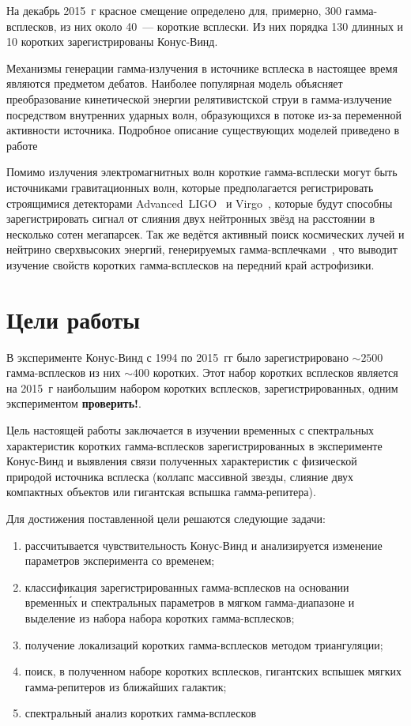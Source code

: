 На декабрь 2015~г красное смещение определено для, примерно, 300 гамма-всплесков, 
из них около 40~--- короткие всплески. Из них порядка 130 длинных и 10 коротких 
зарегистрированы Конус-Винд.

Механизмы генерации гамма-излучения в источнике всплеска в настоящее время 
являются предметом дебатов. Наиболее популярная модель объясняет преобразование 
кинетической энергии релятивистской струи в гамма-излучение посредством внутренних
ударных волн, образующихся в потоке из-за переменной активности источника.
Подробное описание существующих моделей приведено в работе~\citep{Kumar_and_Zhang_2014PhR}

Помимо излучения электромагнитных волн короткие гамма-всплески могут быть источниками гравитационных волн, 
которые предполагается регистрировать строящимися детекторами Advanced~LIGO~\citep{Harry_2010CQGra} 
и Virgo~\citep{Accadia_2012JInst}, которые будут способны зарегистрировать сигнал от слияния
двух нейтронных звёзд на расстоянии в несколько сотен мегапарсек.
Так же ведётся активный поиск космических лучей и нейтрино сверхвысоких энергий,
генерируемых гамма-всплечками~\citep{Aartsen_2015ApJ,Baerwald_2015APh}, 
что выводит изучение свойств коротких гамма-всплесков на передний край астрофизики.

\section{Цели работы}
В эксперименте Конус-Винд с 1994 по 2015~гг было зарегистрировано 
$\sim 2500$ гамма-всплесков из них $\sim 400$ коротких. Этот набор коротких всплесков 
является на 2015~г наибольшим набором коротких всплесков, зарегистрированных, 
одним экспериментом \textbf{проверить!}.

Цель настоящей работы заключается в изучении временных с спектральных характеристик 
коротких гамма-всплесков зарегистрированных в эксперименте Конус-Винд и выявления 
связи полученных характеристик с физической природой источника всплеска 
(коллапс массивной звезды, слияние двух компактных объектов или гигантская вспышка гамма-репитера).

Для достижения поставленной цели решаются следующие задачи:
\begin{enumerate}
\item рассчитывается чувствительность Конус-Винд и анализируется изменение параметров 
эксперимента со временем;
\item классификация зарегистрированных гамма-всплесков на основании временн\'{ы}х 
и спектральных параметров в мягком гамма-диапазоне и выделение из набора набора коротких гамма-всплесков; 
\item получение локализаций коротких гамма-всплесков методом триангуляции; 
\item поиск, в полученном наборе коротких всплесков, гигантских 
вспышек мягких гамма-репитеров из ближайших галактик;
\item спектральный анализ коротких гамма-всплесков
\end{enumerate}

